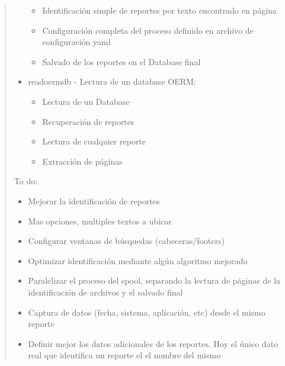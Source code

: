 \documentclass[a4paper,12pt,spanish]{sphinxmanual}
\begin{document}
\begin{quote}
\begin{itemize}
\begin{itemize}
\item {} 
Identificación simple de reportes por texto encontrado en página

\item {} 
Configuración completa del proceso definido en archivo de configuración yaml

\item {} 
Salvado de los reportes en el Database final

\end{itemize}

\item {} 
readoermdb - Lectura de un database OERM:
\begin{itemize}
\item {} 
Lectura de un Database

\item {} 
Recuperación de reportes

\item {} 
Lectura de cualquier reporte

\item {} 
Extracción de páginas

\end{itemize}

\end{itemize}

To do:
\begin{itemize}
\item {} 
Mejorar la identificación de reportes

\item {} 
Mas opciones, multiples textos a ubicar

\item {} 
Configurar ventanas de búsquedas (cabeceras/footers)

\item {} 
Optimizar identificación mediante algún algoritmo mejorado

\item {} 
Paralelizar el proceso del spool, separando la lectura de páginas de la identificación de archivos y el salvado final

\item {} 
Captura de datos (fecha, sistema, aplicación, etc) desde el mismo reporte

\item {} 
Definir mejor los datos adicionales de los reportes. Hoy el único dato real que identifica un reporte el el nombre del mismo

\end{itemize}
\end{quote}
\end{document}
